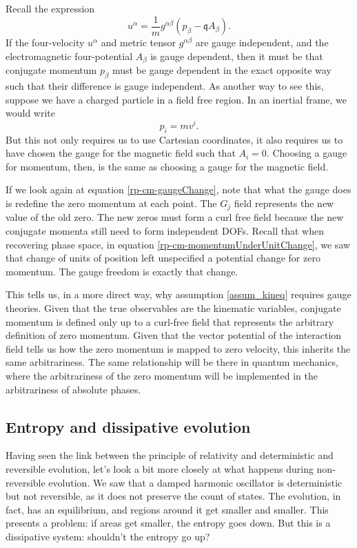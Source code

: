 Recall the expression
\begin{equation}
	u^{\alpha} = \frac{1}{m} g^{\alpha\beta}(p_{\beta} - \mathfrak{q} A_{\beta}).
\end{equation}
If the four-velocity $u^{\alpha}$ and metric tensor $g^{\alpha\beta}$ are gauge independent, and the electromagnetic four-potential $A_\beta$ is gauge dependent, then it must be that conjugate momentum $p_\beta$ must be gauge dependent in the exact opposite way such that their difference is gauge independent. As another way to see this, suppose we have a charged particle in a field free region. In an inertial frame, we would write
\begin{equation}
	p_i = m v^i.
\end{equation}
But this not only requires us to use Cartesian coordinates, it also requires us to have chosen the gauge for the magnetic field such that $A_i = 0$. Choosing a gauge for momentum, then, is the same as choosing a gauge for the magnetic field.

If we look again at equation \ref{rp-cm-gaugeChange}, note that what the gauge does is redefine the zero momentum at each point. The $G_j$ field represents the new value of the old zero. The new zeros must form a curl free field because the new conjugate momenta still need to form independent DOFs. Recall that when recovering phase space, in equation \ref{rp-cm-momentumUnderUnitChange}, we saw that change of units of position left unspecified a potential change for zero momentum. The gauge freedom is exactly that change.

This tells us, in a more direct way, why assumption \ref{assum_kineq} requires gauge theories. Given that the true observables are the kinematic variables, conjugate momentum is defined only up to a curl-free field that represents the arbitrary definition of zero momentum. Given that the vector potential of the interaction field tells us how the zero momentum is mapped to zero velocity, this inherits the same arbitrariness. The same relationship will be there in quantum mechanics, where the arbitrariness of the zero momentum will be implemented in the arbitrariness of absolute phases.

\subsection{Entropy and dissipative evolution}

Having seen the link between the principle of relativity and deterministic and reversible evolution, let's look a bit more closely at what happens during non-reversible evolution. We saw that a damped harmonic oscillator is deterministic but not reversible, as it does not preserve the count of states. The evolution, in fact, has an equilibrium, and regions around it get smaller and smaller. This presents a problem: if areas get smaller, the entropy goes down. But this is a dissipative system: shouldn't the entropy go up?

